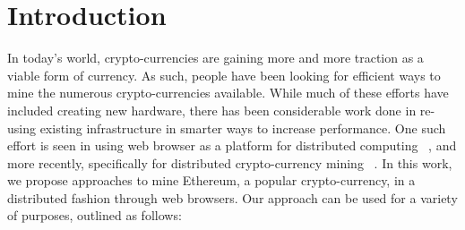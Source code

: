 \documentclass[10pt, conference, compsocconf]{IEEEtran}
\begin{document}
\section{Introduction}
In today's world, crypto-currencies are gaining more and more traction as a viable form of currency. As such, people have been looking for efficient ways to mine the numerous crypto-currencies available. While much of these efforts have included creating new hardware, there has been considerable work done in re-using existing infrastructure in smarter ways to increase performance. One such effort is seen in using web browser as a platform for distributed computing ~\cite{Cushing}, and more recently, specifically for distributed crypto-currency mining ~\cite{coinhive}. In this work, we propose approaches to mine Ethereum, a popular crypto-currency, in a distributed fashion through web browsers. Our approach can be used for a variety of purposes, outlined as follows: 
\end{document}
